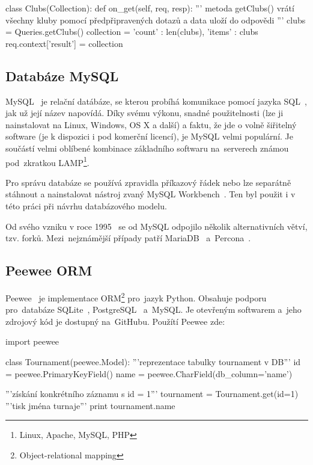 \begin{python}
class Clubs(Collection):
    def on_get(self, req, resp):
        '''
        metoda getClubs() vrátí všechny kluby
        pomocí předpřipravených dotazů a data
        uloží do odpovědi
        '''
        clubs = Queries.getClubs()
        collection = {
            'count' : len(clubs),
            'items' : clubs
        }
        req.context['result'] = collection
\end{python}

\subsection{Databáze MySQL}

MySQL~\cite{mysql} je relační datábáze, se kterou probíhá komunikace pomocí jazyka SQL~\cite{sql}, jak už její název napovídá.
Díky svému výkonu, snadné použitelnosti (lze ji nainstalovat na Linux, Windows, OS X a další) a faktu,
že jde o volně šiřitelný software (je k dispozici i pod komerční licencí),
je MySQL velmi populární. Je součástí velmi oblíbené kombinace
základního softwaru na~serverech známou pod~zkratkou LAMP\footnote{Linux, Apache, MySQL, PHP}.

Pro správu databáze se používá zpravidla příkazový řádek nebo lze separátně stáhnout
a nainstalovat nástroj zvaný MySQL Workbench~\cite{workbench}. Ten byl použit i v této práci při návrhu databázového modelu.

Od svého vzniku v roce 1995~\cite{mysql_history} se od MySQL odpojilo několik alternativních větví, tzv. forků.
Mezi~nejznámější případy patří MariaDB~\cite{mariadb} a~Percona~\cite{percona}.

\subsection{Peewee ORM}


Peewee~\cite{peewee} je implementace ORM\footnote{Object-relational mapping} pro~jazyk Python.
Obsahuje podporu pro~databáze SQLite~\cite{sqllite}, PostgreSQL~\cite{postgresql} a~MySQL.
Je otevřeným softwarem a~jeho zdrojový kód je dostupný na~GitHubu. Použítí Peewee zde: 

\begin{python}
import peewee

class Tournament(peewee.Model):
   '''reprezentace tabulky tournament v DB'''
   id = peewee.PrimaryKeyField()
   name = peewee.CharField(db_column='name')

'''získání konkrétního záznamu s id = 1'''
tournament = Tournament.get(id=1)
'''tisk jména turnaje'''
print tournament.name
\end{python}

